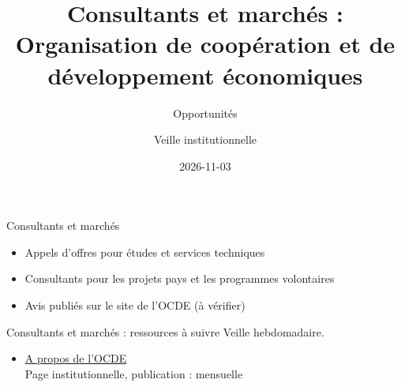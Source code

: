 \documentclass[aspectratio=169,11pt]{beamer}
\title{Consultants et marchés : Organisation de coopération et de développement économiques}
\subtitle{Opportunités}
\author{Veille institutionnelle}
\date{2026-11-03}
\begin{document}
\begin{frame}\titlepage\end{frame}

\begin{frame}{Consultants et marchés}
\begin{itemize}
\item Appels d'offres pour études et services techniques
\item Consultants pour les projets pays et les programmes volontaires
\item Avis publiés sur le site de l'OCDE (à vérifier)
\end{itemize}
\end{frame}

\begin{frame}{Consultants et marchés : ressources à suivre}
\small
Veille hebdomadaire.
\begin{itemize}
\item \href{https://www.oecd.org/en/about.html}{A propos de l'OCDE}\\{\footnotesize Page institutionnelle, publication : mensuelle}
\end{itemize}
\end{frame}
\end{document}
